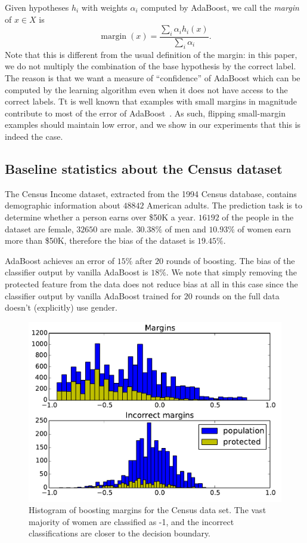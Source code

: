 \documentclass{article}
\DeclareMathOperator{\margin}{margin}
\begin{document}
Given hypotheses $h_i$ with weights $\alpha_i$ computed by AdaBoost, we call the
\emph{margin} of $x \in X$ is $$ \margin(x) = \frac{\sum_i \alpha_i
h_i(x)}{\sum_i \alpha_i}.$$
Note that this is different from the usual definition of the margin: in this paper,
we do not multiply the combination of the base hypothesis by the correct label.
The reason is that we want a measure of ``confidence'' of AdaBoost which can be
computed by the learning algorithm even when it does not have access to the
correct labels.
Tt is well known that examples with small
margins in magnitude contribute to most of the error of
AdaBoost~\citep{SchapireFBL98}.  As such, flipping small-margin examples should
maintain low error, and we show in our experiments that this is indeed the
case.

\subsection{Baseline statistics about the Census dataset}

The Census Income dataset, extracted from the 1994 Census database,
contains demographic information about $48842$ American adults.
The prediction task is to determine whether a person earns over \$50K
a year. $16192$ of the people in the dataset are female, $32650$
are male. $30.38\%$ of men and $10.93\%$ of women earn more than \$50K,
therefore the bias of the dataset is $19.45\%$.

AdaBoost achieves an error of $15\%$ after $20$ rounds of boosting.
The bias of the classifier output by vanilla AdaBoost is $18\%$.
We note that simply removing the protected feature from the data
does not reduce bias at all in this case since 
the classifier output by vanilla AdaBoost
trained for $20$ rounds on the full data doesn't (explicitly) use gender.

\begin{figure}[t]
\centering
\includegraphics[width=\columnwidth]{images/censusmargins.pdf}
\caption{Histogram of boosting margins for the Census data set. The vast
majority of women are classified as -1, and the incorrect classifications are
closer to the decision boundary.}
\label{fig:boosting-margins}
\end{figure}
\end{document}
